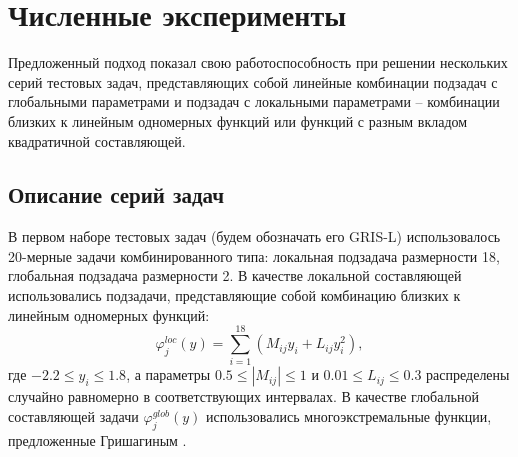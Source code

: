 \documentclass[11pt, oneside, a4paper]{article}
\begin{document}
\section{Численные эксперименты}

Предложенный подход показал свою работоспособность при решении нескольких серий тестовых задач, представляющих собой линейные комбинации подзадач с глобальными параметрами и подзадач с локальными параметрами -- комбинации близких к линейным одномерных функций или функций с разным вкладом квадратичной составляющей.

\subsection{Описание серий задач}

В первом наборе тестовых задач (будем обозначать его GRIS-L) использовалось 20-мерные задачи комбинированного типа: локальная подзадача размерности 18, глобальная подзадача размерности 2. В качестве локальной составляющей использовались подзадачи, представляющие собой комбинацию близких к линейным одномерных функций:
\begin{equation}\label{X2_problem}
\varphi_j^{loc}(y) = \sum_{i=1}^{18} \left(M_{ij} y_i + L_{ij} y_i^2\right) ,
\end{equation}
где $-2.2 \leq y_i \leq 1.8$, а параметры $0.5 \leq |M_{ij}| \leq 1$ и $0.01 \leq L_{ij} \leq 0.3$  распределены случайно равномерно в соответствующих интервалах. В качестве глобальной составляющей задачи $\varphi_j^{glob}(y)$ использовались многоэкстремальные функции, предложенные Гришагиным \cite{Grishagin2001}.
\end{document}
